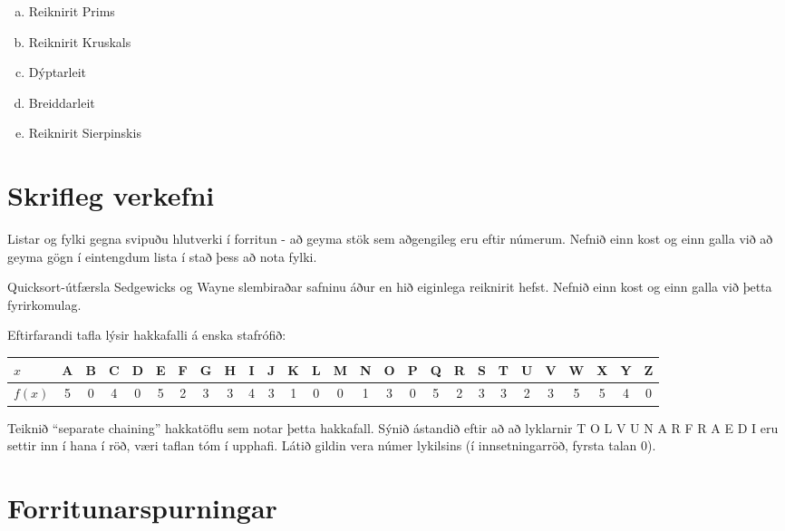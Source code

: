 \documentclass[addpoints]{exam}
\begin{document}
\begin{questions}
	\begin{enumerate}[a)]
		\item Reiknirit Prims
		\item Reiknirit Kruskals
		\item Dýptarleit
		\item Breiddarleit
		\item Reiknirit Sierpinskis
	\end{enumerate}

	\section{Skrifleg verkefni}

	\question[5]
	Listar og fylki gegna svipuðu hlutverki í forritun - að geyma stök sem aðgengileg eru eftir númerum. Nefnið einn kost og einn galla við að geyma gögn í eintengdum lista í stað þess að nota fylki.


	\question[5]
	Quicksort-útfærsla Sedgewicks og Wayne slembiraðar safninu áður en hið eiginlega reiknirit hefst. Nefnið einn kost og einn galla við þetta fyrirkomulag.


	\newpage

	\question[5]

	Eftirfarandi tafla lýsir hakkafalli á enska stafrófið:

	\begin{center}
		\scriptsize
		\begin{tabular}{l*{26}{c}}
			\toprule
			$x$    & A & B & C & D & E & F & G & H & I & J & K & L & M & N & O & P & Q & R & S & T & U & V & W & X & Y & Z \\
			\midrule
			$f(x)$ & 5 & 0 & 4 & 0 & 5 & 2 & 3 & 3 & 4 & 3 & 1 & 0 & 0 & 1 & 3 & 0 & 5 & 2 & 3 & 3 & 2 & 3 & 5 & 5 & 4 & 0 \\
			\bottomrule
		\end{tabular}
	\end{center}

	Teiknið ``separate chaining'' hakkatöflu sem notar þetta hakkafall. Sýnið ástandið eftir að að lyklarnir T O L V U N A R F R A E D I eru settir inn í hana í röð, væri taflan tóm í upphafi. Látið gildin vera númer lykilsins (í innsetningarröð, fyrsta talan 0).


	\newpage

	\section{Forritunarspurningar}


\end{questions}
\end{document}
